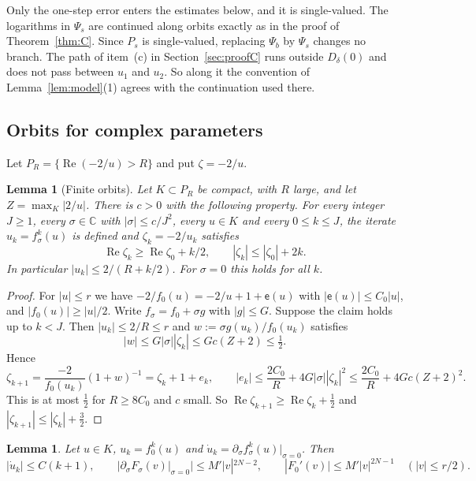 \documentclass[11pt]{amsart}
\newtheorem{lemma}[theorem]{Lemma}
\theoremstyle{definition}
\begin{document}
Only the one-step error enters the estimates below, and it is single-valued.
The logarithms in $\Psi_s$ are continued along orbits exactly as in the proof of
Theorem~\ref{thm:C}.  Since $P_s$ is single-valued, replacing $\Psi_b$ by
$\Psi_s$ changes no branch.  The path of item~(c) in Section~\ref{sec:proofC}
runs outside $D_\delta(0)$ and does not pass between $u_1$ and $u_2$.  So
along it the convention of Lemma~\ref{lem:model}(1) agrees with the continuation
used there.

\subsection{Orbits for complex parameters}
Let $P_R=\{\operatorname{Re}(-2/u)>R\}$ and put $\zeta=-2/u$.

\begin{lemma}[Finite orbits]\label{lem:finite}
Let $K\subset P_R$ be compact, with $R$ large, and let
$Z=\max_K|2/u|$.  There is $c>0$ with the following property.  For every
integer $J\ge1$, every $\sigma\in\mathbb C$ with $|\sigma|\le c/J^2$, every
$u\in K$ and every $0\le k\le J$, the iterate $u_k=f_\sigma^k(u)$ is defined
and $\zeta_k=-2/u_k$ satisfies
\[
 \operatorname{Re}\zeta_k\ge\operatorname{Re}\zeta_0+k/2,\qquad
 |\zeta_k|\le|\zeta_0|+2k .
\]
In particular $|u_k|\le2/(R+k/2)$.  For $\sigma=0$ this holds for all $k$.
\end{lemma}

\begin{proof}
For $|u|\le r$ we have $-2/f_0(u)=-2/u+1+\mathsf e(u)$ with $|\mathsf e(u)|\le C_0|u|$,
and $|f_0(u)|\ge|u|/2$.  Write $f_\sigma=f_0+\sigma g$ with $|g|\le G$.
Suppose the claim holds up to $k<J$.  Then $|u_k|\le2/R\le r$ and
$w:=\sigma g(u_k)/f_0(u_k)$ satisfies
\[
 |w|\le G|\sigma||\zeta_k|\le Gc(Z+2)\le\tfrac12 .
\]
Hence
\[
 \zeta_{k+1}=\frac{-2}{f_0(u_k)}(1+w)^{-1}=\zeta_k+1+e_k,\qquad
 |e_k|\le\frac{2C_0}R+4G|\sigma||\zeta_k|^2\le\frac{2C_0}R+4Gc(Z+2)^2 .
\]
This is at most $\tfrac12$ for $R\ge8C_0$ and $c$ small.  So
$\operatorname{Re}\zeta_{k+1}\ge\operatorname{Re}\zeta_k+\tfrac12$ and
$|\zeta_{k+1}|\le|\zeta_k|+\tfrac32$.
\end{proof}

\begin{lemma}\label{lem:derbounds}
Let $u\in K$, $u_k=f_0^k(u)$ and $\dot u_k=\partial_\sigma f_\sigma^k(u)|_{\sigma=0}$.
Then
\[
 |\dot u_k|\le C(k+1),\qquad |\partial_\sigma F_\sigma(v)|_{\sigma=0}|\le M'|v|^{2N-2},\qquad
 |F_0'(v)|\le M'|v|^{2N-1}\quad(|v|\le r/2).
\]
\end{lemma}
\end{document}
